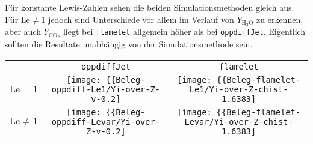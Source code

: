 Für konstante Lewis-Zahlen sehen die beiden Simulationsmethoden gleich aus. Für $\mathrm{Le}\neq 1$ jedoch sind Unterschiede vor allem im Verlauf von $Y_{\mathrm{H}_2\mathrm{O}}$ zu erkennen, aber auch $Y_{\mathrm{CO}_2}$ liegt bei \texttt{flamelet} allgemein höher als bei \texttt{oppdiffJet}. Eigentlich sollten die Resultate unabhängig von der Simulationsmethode sein.


\begin{minipage}{\linewidth}
    \captionsetup{type=table}
    \begin{tabular}{ccc}
        & \texttt{oppdiffJet} & \texttt{flamelet} \\
        $\mathrm{Le}=1$ &
        \texttt{[image: \{\{Beleg-oppdiff-Le1/Yi-over-Z-v-0.2]}}}   &
        \texttt{[image: \{\{Beleg-flamelet-Le1/Yi-over-Z-chist-1.6383]}}} \\
        $\mathrm{Le}\neq 1$ &
        \texttt{[image: \{\{Beleg-oppdiff-Levar/Yi-over-Z-v-0.2]}}}   &
        \texttt{[image: \{\{Beleg-flamelet-Levar/Yi-over-Z-chist-1.6383]}}}
    \end{tabular}
\end{minipage}

%


